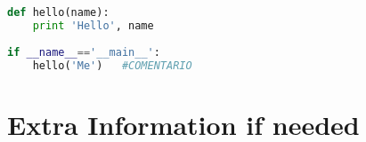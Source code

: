 \documentclass[12pt]{article}  %
\begin{document}
\begin{lstlisting}[language=Python, caption=Código en Python]
  def hello(name):
    print 'Hello', name
 
if __name__=='__main__':
    hello('Me')   #COMENTARIO 
\end{lstlisting}


\newpage %
\appendix %
\section{Extra Information if needed}


\clearpage %
\end{document}
